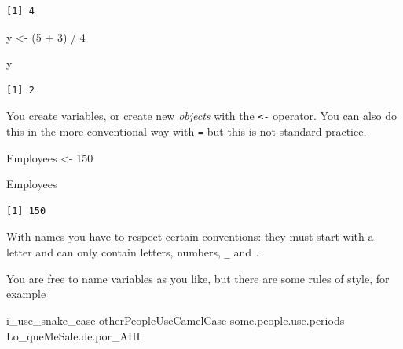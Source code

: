 \documentclass[
  letterpaper,
  DIV=11,
  numbers=noendperiod]{scrartcl}
\newenvironment{Shaded}{\begin{snugshade}}{\end{snugshade}}
\newcommand{\DecValTok}[1]{\textcolor[rgb]{0.68,0.00,0.00}{#1}}
\newcommand{\NormalTok}[1]{\textcolor[rgb]{0.00,0.23,0.31}{#1}}
\newcommand{\OtherTok}[1]{\textcolor[rgb]{0.00,0.23,0.31}{#1}}
\newcommand{\SpecialCharTok}[1]{\textcolor[rgb]{0.37,0.37,0.37}{#1}}
\begin{document}
\begin{verbatim}
[1] 4
\end{verbatim}

\begin{Shaded}
\begin{Highlighting}[]
\NormalTok{y }\OtherTok{\textless{}{-}}\NormalTok{ (}\DecValTok{5} \SpecialCharTok{+} \DecValTok{3}\NormalTok{) }\SpecialCharTok{/} \DecValTok{4}

\NormalTok{y}
\end{Highlighting}
\end{Shaded}

\begin{verbatim}
[1] 2
\end{verbatim}

You create variables, or create new \emph{objects} with the
\texttt{\textless{}-} operator. You can also do this in the more
conventional way with \texttt{=} but this is not standard practice.

\begin{Shaded}
\begin{Highlighting}[]
\NormalTok{Employees }\OtherTok{\textless{}{-}} \DecValTok{150}

\NormalTok{Employees}
\end{Highlighting}
\end{Shaded}

\begin{verbatim}
[1] 150
\end{verbatim}

With names you have to respect certain conventions: they must start with
a letter and can only contain letters, numbers, \texttt{\_} and
\texttt{.}.

You are free to name variables as you like, but there are some rules of
style, for example

\begin{Shaded}
\begin{Highlighting}[]
\NormalTok{i\_use\_snake\_case}
\NormalTok{otherPeopleUseCamelCase}
\NormalTok{some.people.use.periods}
\NormalTok{Lo\_queMeSale.de.por\_AHI}
\end{Highlighting}
\end{Shaded}
\end{document}
